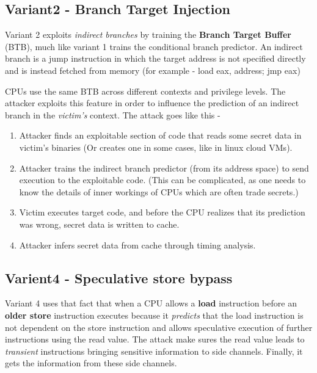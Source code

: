 \documentclass[12pt]{article}
\begin{document}
\subsection{Variant2 - Branch Target Injection}
Variant 2 exploits \textit{indirect branches} by training the \textbf{Branch Target Buffer} (BTB), much like variant 1 trains the conditional branch predictor. An indirect branch is a jump instruction in which the target address is not specified directly and is instead fetched from memory (for example - load eax, address; jmp eax)

CPUs use the same BTB across different contexts and privilege levels. The attacker exploits this feature in order to influence the prediction of an indirect branch in the \textit{victim's} context. The attack goes like this - 
 \begin{enumerate}
 \item Attacker finds an exploitable section of code that reads some secret data in victim's binaries (Or creates one in some cases, like in linux cloud VMs).
 \item Attacker trains the indirect branch predictor (from its address space) to send execution to the exploitable code. (This can be complicated, as one needs to know the details of inner workings of CPUs which are often trade secrets.)
 \item Victim executes target code, and before the CPU realizes that its prediction was wrong, secret data is written to cache.
 \item Attacker infers secret data from cache through timing analysis.
 \end{enumerate}
\subsection{Varient4 - Speculative store bypass}

Variant 4 uses that fact that when a CPU allows a \textbf{load} instruction before an \textbf{older store} instruction executes because it \textit{predicts} that the load instruction is not dependent on the store instruction and allows speculative execution of further instructions using the read value.
The attack make sures the read value leads to \textit{transient} instructions bringing sensitive information to side channels. Finally, it gets the information from these side channels.
\end{document}
